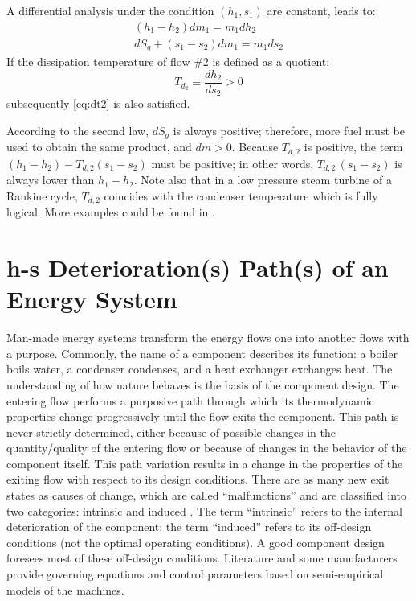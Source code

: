 \documentclass[energies,article,submit,moreauthors,pdftex]{Definitions/mdpi}
\begin{document}
A differential analysis under the condition $(h_1,s_1)$ are constant, leads to:
\begin{align}
\left(h_1 - h_2\right) dm_1 = m_1 dh_2 \\
dS_g + \left(s_1 - s_2\right) dm_1 =  m_1 ds_2 
\end{align}
If the dissipation temperature of flow \#2 is defined as a quotient:
\[
	T_{d_2}\equiv \frac{dh_2}{ds_2}>0
\]
subsequently \cref{eq:dt2} is also satisfied.

According to the second law, $dS_g$ is always positive; therefore, more fuel must be used to obtain the same product, and $dm > 0$. Because $T_{d,2}$ is positive, the term $(h_1-h_2 )-T_{d,2} (s_1-s_2 )$ must be positive; in other words, $T_{d,2}\,(s_1-s_2)$ is always lower than $h_1-h_2$. Note also that in a low pressure steam turbine of a Rankine cycle, $T_{d,2}$ coincides with the condenser temperature which is fully logical. More examples could be found in \cite{Royo1995}.

\section{h-s Deterioration(s) Path(s) of an Energy System}
Man-made energy systems transform the energy flows one into another flows with a purpose. Commonly, the name of a component describes its function: a boiler boils water, a condenser condenses, and a heat exchanger exchanges heat. The understanding of how nature behaves is the basis of the component design. The entering flow performs a purposive path through which its thermodynamic properties change progressively until the flow exits the component. This path is never strictly determined, either because of possible changes in the quantity/quality of the entering flow or because of changes in the behavior of the component itself. This path variation results in a change in the properties of the exiting flow with respect to its design conditions. There are as many new exit states as causes of change, which are called “malfunctions” and are classified into two categories: intrinsic and induced \cite{Valero2004c,Valero1999c,Torres1999}. The term “intrinsic” refers to the internal deterioration of the component; the term “induced” refers to its off-design conditions (not the optimal operating conditions). A good component design foresees most of these off-design conditions. Literature and some manufacturers provide governing equations and control parameters based on semi-empirical models of the machines.
\end{document}
